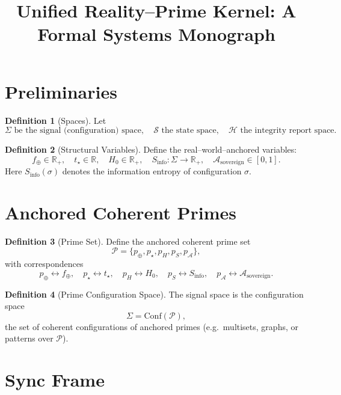 \documentclass[12pt]{article}
\title{Unified Reality--Prime Kernel: A Formal Systems Monograph}
\author{}
\date{}
\theoremstyle{definition}
\newtheorem{definition}{Definition}[section]
\theoremstyle{plain}
\begin{document}
\maketitle

\tableofcontents

\section{Preliminaries}

\begin{definition}[Spaces]
Let
\[
\Sigma \text{ be the signal (configuration) space}, \quad
\mathcal{S} \text{ the state space}, \quad
\mathcal{H} \text{ the integrity report space}.
\]
\end{definition}

\begin{definition}[Structural Variables]
Define the real--world--anchored variables:
\[
f_{\oplus} \in \mathbb{R}_{+}, \quad
t_{\star} \in \mathbb{R}, \quad
H_0 \in \mathbb{R}_{+}, \quad
S_{\mathrm{info}} : \Sigma \to \mathbb{R}_{+}, \quad
\mathcal{A}_{\mathrm{sovereign}} \in [0,1].
\]
Here \(S_{\mathrm{info}}(\sigma)\) denotes the information entropy of configuration \(\sigma\).
\end{definition}

\section{Anchored Coherent Primes}

\begin{definition}[Prime Set]
Define the anchored coherent prime set
\[
\mathcal{P} = \{p_{\oplus}, p_{\star}, p_{H}, p_{S}, p_{\mathcal{A}}\},
\]
with correspondences
\[
p_{\oplus} \leftrightarrow f_{\oplus}, \quad
p_{\star} \leftrightarrow t_{\star}, \quad
p_{H} \leftrightarrow H_0, \quad
p_{S} \leftrightarrow S_{\mathrm{info}}, \quad
p_{\mathcal{A}} \leftrightarrow \mathcal{A}_{\mathrm{sovereign}}.
\]
\end{definition}

\begin{definition}[Prime Configuration Space]
The signal space is the configuration space
\[
\Sigma = \mathrm{Conf}(\mathcal{P}),
\]
the set of coherent configurations of anchored primes (e.g.\ multisets, graphs, or patterns over \(\mathcal{P}\)).
\end{definition}

\section{Sync Frame}
\end{document}
